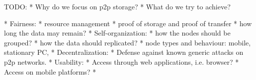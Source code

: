 TODO:
* Why do we focus on p2p storage?
* What do we try to achieve?

* Fairness:
  * resource management
  * proof of storage and proof of transfer
  * how long the data may remain?
* Self-organization:
  * how the nodes should be grouped?
  * how the data should replicated?
  * node types and behaviour: mobile, stationary PC,
* Decentralization:
  * Defense against known generic attacks on p2p networks.
* Usability:
  * Access through web applications, i.e. browser?
  * Access on mobile platforms?
  *


